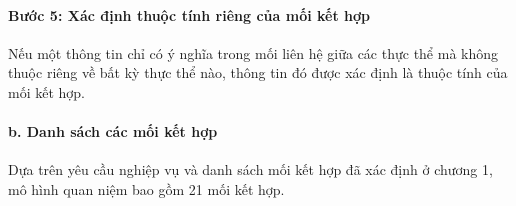 \paragraph{Bước 5: Xác định thuộc tính riêng của mối kết hợp}\mbox{}\par
Nếu một thông tin chỉ có ý nghĩa trong mối liên hệ giữa các thực thể mà không thuộc riêng về bất kỳ thực thể nào, thông tin đó được xác định là thuộc tính của mối kết hợp.

\paragraph{b. Danh sách các mối kết hợp}\mbox{}\par

Dựa trên yêu cầu nghiệp vụ và danh sách mối kết hợp đã xác định ở chương 1, mô hình quan niệm bao gồm 21 mối kết hợp.

